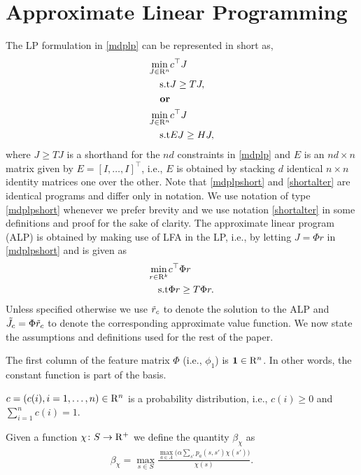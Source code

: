 \documentclass[12pt,draftcls,onecolumn]{IEEEtran}
\begin{document}
\section{Approximate Linear Programming}
The LP formulation in \eqref{mdplp} can be represented in short as,
\begin{align}\label{mdplpshort}
\min_{J\in \R^n} &c^\top J\nn\\
\text{s.t}\mb &J\geq T J,\\
\textbf{or}\nn\\
\label{shortalter}
\min_{J\in \R^n} &c^\top J\nn\\
\text{s.t}\mb &EJ\geq H J,\\
\end{align}
where $J\geq TJ$ is a shorthand for the $nd$ constraints in \eqref{mdplp} and $E$ is an $nd\times n$ matrix given by $E=[I,\ldots,I]^\top$, i.e., $E$ is obtained by stacking $d$ identical $n\times n$ identity matrices one over the other. Note that \eqref{mdplpshort} and \eqref{shortalter} are identical programs and differ only in notation. We use notation of type \eqref{mdplpshort} whenever we prefer brevity and we use notation \eqref{shortalter} in some definitions and proof for the sake of clarity.
The approximate linear program (ALP) is obtained by making use of LFA in the LP, i.e., by letting $J=\Phi r$ in \eqref{mdplpshort} and is given as
\begin{align}\label{alp}
\min_{r\in \R^k} &c^\top \Phi r\nn\\
\text{s.t}\mb &\Phi r\geq T \Phi r.
\end{align}
Unless specified otherwise we use $\tilde{r}_c$ to denote the solution to the ALP and $\tilde{J}_c=\Phi \tilde{r}_c$ to denote the corresponding approximate value function. We now state the assumptions and definitions used for the rest of the paper.
\begin{assumption}\label{one}
The first column of the feature matrix $\Phi$ (i.e., $\phi_1$) is $\mathbf{1} \in \mathrm{R}^n$. In other words, the constant function is part of the basis.
\end{assumption}
\begin{assumption}\label{probdist}
$c=(c(i),i=1,\ldots,n)\in \mathrm{R}^n$ is a probability distribution, i.e., $c(i)\geq 0$ and $\sum_{i=1}^n c(i)=1$.
\end{assumption}
\begin{definition}
Given a function $\chi\colon S\rightarrow \mathrm{R}^+$ we define the quantity $\beta_{\chi}$ as
\begin{align}
\beta_{\chi}=\max_{s \in S} \frac{\underset{a \in A}{\max}\big(\alpha\sum_{s'}p_a(s,s')\chi(s')\big)}{\chi(s)}.
\end{align}
\end{definition}
\end{document}
